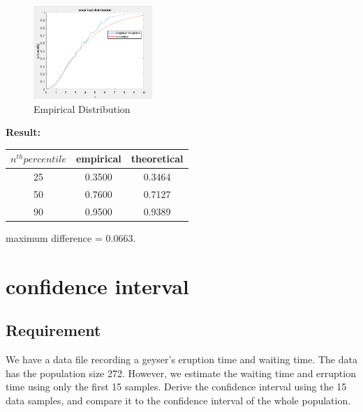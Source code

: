 \documentclass[twoside]{article}
\begin{document}
\begin{multicols}{2}
\begin{figure}[H]
   \centering
   \includegraphics[width = 0.4\textwidth]{../data/sample100.png}  
   \caption{Empirical Distribution}
\end{figure}
\noindent \textbf {Result:\\[15pt]}
\begin{tabular}{|| c | c | c ||}
 \hline \hline
 $n^{th} percentile$ & empirical  & theoretical \\ \hline \hline
25 & 0.3500 & 0.3464 \\ \hline
50 & 0.7600 & 0.7127\\ \hline
90 & 0.9500 & 0.9389\\ \hline
\end{tabular}
maximum difference = 0.0663.
\end{multicols}

\section{confidence interval}
\subsection{\normalsize{Requirement}}
We have a data file recording a geyser's eruption time and waiting time. The data has the population size 272. However, we estimate the waiting time and erruption time using only the first 15 samples. Derive the confidence interval using the 15 data samples, and compare it to the confidence interval of the whole population.\\
\end{document}
